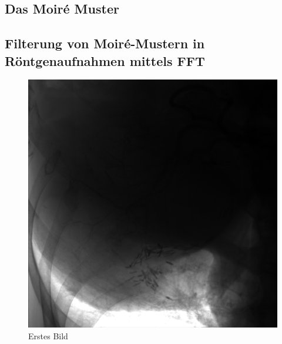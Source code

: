 \documentclass[a4paper,12pt]{article}
\theoremstyle{definition}
\theoremstyle{remark}
\begin{document}
\subsection{Das Moiré Muster}
\subsection{Filterung von Moiré-Mustern in Röntgenaufnahmen mittels FFT}

\begin{figure}[H]
  \centering
  \begin{minipage}{0.49\textwidth}
    \centering
    \includegraphics[width=\linewidth]{Bilder/original.png}
    \caption{Erstes Bild}
    \label{fig:bild1}
  \end{minipage}
  \hfill
  \begin{minipage}{0.49\textwidth}
    \centering

\end{minipage}
\end{figure}
\end{document}
